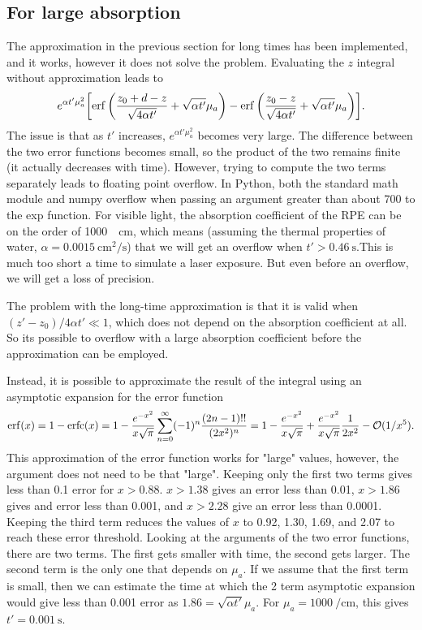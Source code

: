 \documentclass[]{article}
\DeclareMathOperator\erfc{erfc}
\begin{document}
\subsection{For large absorption}
The approximation in the previous section for long times has been implemented, and it works, however it does not solve the problem. Evaluating the $z$ integral without approximation leads to
\begin{equation*}
	e^{\alpha t' \mu_a^2} \qty[	
	\erf\qty(\frac{z_0 + d - z}{\sqrt{4\alpha t'}} + \sqrt{\alpha t'}\mu_a ) - \erf\qty(\frac{z_0 - z}{\sqrt{4\alpha t'}} + \sqrt{\alpha t'}\mu_a )].
\end{equation*}
The issue is that as $t'$ increases, $e^{\alpha t' \mu_a^2}$ becomes very large. The difference between the two error functions becomes small, so the product of the two remains finite (it actually decreases with time).
However, trying to compute the two terms separately leads to floating point overflow. In Python, both the standard math module and numpy overflow when passing an argument greater than about 700 to the exp function. For
visible light, the absorption coefficient of the RPE can be on the order of \SI{1000}{\per\centi\meter}, which means (assuming the thermal properties of water, $\alpha = \SI{0.0015}{\centi\meter\squared\per\second}$)
that we will get an overflow when $t' > \SI{0.46}{\second}$.This is much too short a time to simulate a laser exposure. But even before an overflow, we will get a loss of precision.

The problem with the long-time approximation is that it is valid when $(z'-z_0)/4\alpha t' \ll 1$, which does not depend on the absorption coefficient at all. So its possible to overflow with a large absorption coefficient
before the approximation can be employed.

Instead, it is possible to approximate the result of the integral using an asymptotic expansion for the error function
\begin{equation}
	\erf(x) = 1 - \erfc(x) = 1 - \frac{e^{-x^2}}{x\sqrt{\pi}} \sum_{n=0}^{\infty} (-1)^n \frac{(2n-1)!!}{(2x^2)^n} =1 - \frac{e^{-x^2}}{x\sqrt{\pi}} +  \frac{e^{-x^2}}{x\sqrt{\pi}} \frac{1}{2 x^2} - \mathcal{O}( 1/x^5).
\end{equation}
This approximation of the error function works for "large" values, however, the argument does not need to be that "large". Keeping only the first two terms gives less than 0.1 error for $x >  0.88$. $x>1.38$ gives an error less
than 0.01, $x>1.86$ gives and error less than 0.001, and $x>2.28$ give an error less than 0.0001. Keeping the third term reduces the values of $x$ to 0.92, 1.30, 1.69, and 2.07 to reach these error threshold. Looking at the arguments
of the two error functions, there are two terms. The first gets smaller with time, the second gets larger. The second term is the only one that depends on $\mu_a$. If we assume that the first term is small, then we can estimate
the time at which the 2 term asymptotic expansion would give less than 0.001 error as $1.86 = \sqrt{\alpha t'} \mu_a$. For $\mu_a = \SI{1000}{\per\centi\meter}$, this gives $t' = \SI{0.001}{\second}$.
\end{document}
